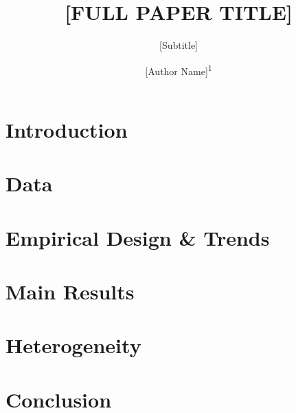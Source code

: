 \documentclass[aspectratio=169]{beamer}
\title[{[SHORT TITLE]}]
{[FULL PAPER TITLE]}
\subtitle{{[Subtitle]}}
\author[{[A. LastName]}]
{[Author Name]\textsuperscript{1}}
\institute[{[INSTITUTION SHORT]}]
{$^{1}$[Institution Full Name]\\
}
\date[{\today}]
{\footnotesize{}}
\begin{document}
\begin{frame}
{\titlepage
}\end{frame}



\section{Introduction}





\section{Data}


\section{Empirical Design \& Trends}



\section{Main Results}




\section{Heterogeneity}


\section{Conclusion}


\end{document}
